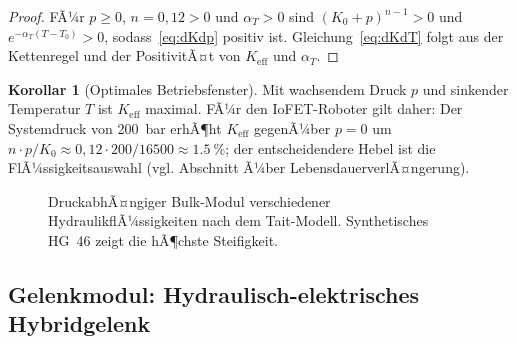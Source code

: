 ﻿\documentclass[a4paper,12pt]{scrreprt}
\theoremstyle{definition}
\newtheorem{korollar}{Korollar}[section]
\begin{document}
\begin{proof}
FÃ¼r $p \geq 0$, $n = 0{,}12 > 0$ und $\alpha_T > 0$ sind $(K_0+p)^{n-1} > 0$
und $e^{-\alpha_T(T-T_0)} > 0$, sodass~\eqref{eq:dKdp} positiv ist.
Gleichung~\eqref{eq:dKdT} folgt aus der Kettenregel und der
PositivitÃ¤t von $K_{\text{eff}}$ und $\alpha_T$.
\end{proof}

\begin{korollar}[Optimales Betriebsfenster]
\label{kor:betrieb}
Mit wachsendem Druck $p$ und sinkender Temperatur $T$ ist
$K_{\text{eff}}$ maximal. FÃ¼r den IoFET-Roboter gilt daher:
Der Systemdruck von \SI{200}{\bar} erhÃ¶ht $K_{\text{eff}}$ gegenÃ¼ber
$p=0$ um $n \cdot p / K_0 \approx 0{,}12 \cdot 200/16500 \approx \SI{1.5}{\percent}$;
der entscheidendere Hebel ist die FlÃ¼ssigkeitsauswahl (vgl.
Abschnitt Ã¼ber LebensdauerverlÃ¤ngerung).
\end{korollar}

\begin{figure}[H]
\centering
{}
\caption{DruckabhÃ¤ngiger Bulk-Modul verschiedener HydraulikflÃ¼ssigkeiten
  nach dem Tait-Modell. Synthetisches HG~46 zeigt die hÃ¶chste Steifigkeit.}
\label{fig:bulkmodul}
\end{figure}

\subsection{Gelenkmodul: Hydraulisch-elektrisches Hybridgelenk}
\end{document}
